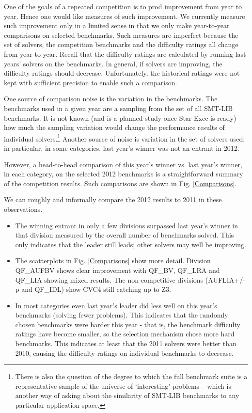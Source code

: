 \documentclass{llncs}
\begin{document}
One of the goals of a repeated competition is to prod improvement from year to year. Hence one would like measures of such improvement. We currently measure such improvement only in a limited sense in that we only make year-to-year comparisons on selected benchmarks. Such measures are imperfect because the set of solvers, the competition benchmarks and the difficulty ratings all change from year to year. Recall that the difficulty ratings are calculated by running last years' solvers on the benchmarks. In general, if solvers are improving, the difficulty ratings should decrease. Unfortunately, the historical ratings were not kept with sufficient precision to enable such a comparison. 

One source of comparison noise is the variation in the benchmarks. The benchmarks used in a given year are a sampling from the set of all SMT-LIB benchmarks. It is not known (and is a planned study once Star-Exec is ready) how much the sampling variation would change the performance results of individual solvers.\footnote{There is also the question of the degree to which the full benchmark suite is a representative sample of the universe of `interesting' problems -- which is another way of asking about the similarity of SMT-LIB benchmarks to any particular application space.} Another source of noise is variation in the set of solvers used; in particular, in some categories, last year's winner was not an entrant in 2012.

However, a head-to-head comparison of this year's winner vs. last year's winner, in each category, on the selected 2012 benchmarks is a straightforward summary of the competition results. Such comparisons are shown in Fig. \ref{Comparisons}.

We can roughly and informally compare the 2012 results to 2011 in these observations.
\begin{itemize}
\item The winning entrant in only a few divisions surpassed last year's winner in that division measured by the overall number of benchmarks solved. This only indicates that the leader still leads; other solvers may well be improving.
\item The scatterplots in Fig. \ref{Comparisons} show more detail. Division QF\_AUFBV shows clear improvement with QF\_BV, QF\_LRA and QF\_LIA showing mixed results. The non-competitive divisions (AUFLIA+/-p and QF\_IDL) show CVC4 still catching up to Z3.
\item In most categories even last year's leader did less well on this year's benchmarks (solving fewer problems). This indicates that the randomly chosen benchmarks were harder this year - that is, the benchmark difficulty ratings have become smaller, so the selection mechanism chose more hard benchmarks. This indicates at least that the 2011 solvers were better than 2010, causing the difficulty ratings on individual benchmarks to decrease.
\end{itemize}
\end{document}
